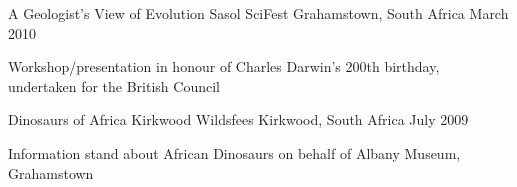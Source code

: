 \begin{cventries}
\cventry
{A Geologist's View of Evolution} %
{Sasol SciFest} %
{Grahamstown, South Africa} %
{March 2010} %
{ %
\begin{cvitems}
\item {Workshop/presentation in honour of Charles Darwin's 200th birthday, undertaken for the British Council}
\end{cvitems}
}


\cventry
{Dinosaurs of Africa} %
{Kirkwood Wildsfees} %
{Kirkwood, South Africa} %
{July 2009} %
{ %
\begin{cvitems}
\item {Information stand about African Dinosaurs on behalf of Albany Museum, Grahamstown}
\end{cvitems}
}

\end{cventries}
